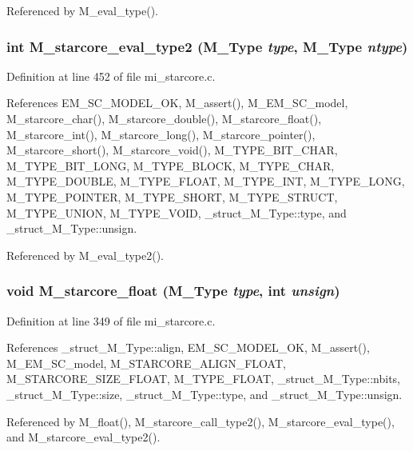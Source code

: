 Referenced by M\_\-eval\_\-type().
\subsubsection{\setlength{\rightskip}{0pt plus 5cm}int M\_\-starcore\_\-eval\_\-type2 (\bf{M\_\-Type} {\em type}, \bf{M\_\-Type} {\em ntype})}\label{mi__starcore_8c_1dd66cb3919d37e019d84cc9e302ea76}




Definition at line 452 of file mi\_\-starcore.c.

References EM\_\-SC\_\-MODEL\_\-OK, M\_\-assert(), M\_\-EM\_\-SC\_\-model, M\_\-starcore\_\-char(), M\_\-starcore\_\-double(), M\_\-starcore\_\-float(), M\_\-starcore\_\-int(), M\_\-starcore\_\-long(), M\_\-starcore\_\-pointer(), M\_\-starcore\_\-short(), M\_\-starcore\_\-void(), M\_\-TYPE\_\-BIT\_\-CHAR, M\_\-TYPE\_\-BIT\_\-LONG, M\_\-TYPE\_\-BLOCK, M\_\-TYPE\_\-CHAR, M\_\-TYPE\_\-DOUBLE, M\_\-TYPE\_\-FLOAT, M\_\-TYPE\_\-INT, M\_\-TYPE\_\-LONG, M\_\-TYPE\_\-POINTER, M\_\-TYPE\_\-SHORT, M\_\-TYPE\_\-STRUCT, M\_\-TYPE\_\-UNION, M\_\-TYPE\_\-VOID, \_\-struct\_\-M\_\-Type::type, and \_\-struct\_\-M\_\-Type::unsign.

Referenced by M\_\-eval\_\-type2().
\subsubsection{\setlength{\rightskip}{0pt plus 5cm}void M\_\-starcore\_\-float (\bf{M\_\-Type} {\em type}, int {\em unsign})}\label{mi__starcore_8c_d4a93b318bdff4020f864ce6acf56b45}




Definition at line 349 of file mi\_\-starcore.c.

References \_\-struct\_\-M\_\-Type::align, EM\_\-SC\_\-MODEL\_\-OK, M\_\-assert(), M\_\-EM\_\-SC\_\-model, M\_\-STARCORE\_\-ALIGN\_\-FLOAT, M\_\-STARCORE\_\-SIZE\_\-FLOAT, M\_\-TYPE\_\-FLOAT, \_\-struct\_\-M\_\-Type::nbits, \_\-struct\_\-M\_\-Type::size, \_\-struct\_\-M\_\-Type::type, and \_\-struct\_\-M\_\-Type::unsign.

Referenced by M\_\-float(), M\_\-starcore\_\-call\_\-type2(), M\_\-starcore\_\-eval\_\-type(), and M\_\-starcore\_\-eval\_\-type2().
